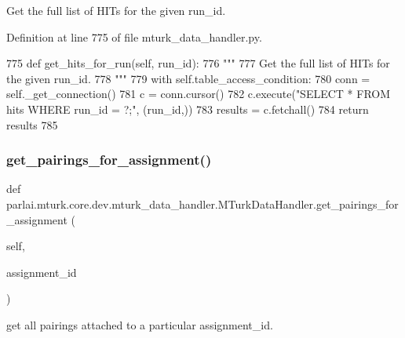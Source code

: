 \begin{DoxyVerb}Get the full list of HITs for the given run_id.
\end{DoxyVerb}
 

Definition at line 775 of file mturk\+\_\+data\+\_\+handler.\+py.


\begin{DoxyCode}
775     \textcolor{keyword}{def }get\_hits\_for\_run(self, run\_id):
776         \textcolor{stringliteral}{"""}
777 \textcolor{stringliteral}{        Get the full list of HITs for the given run\_id.}
778 \textcolor{stringliteral}{        """}
779         with self.table\_access\_condition:
780             conn = self.\_get\_connection()
781             c = conn.cursor()
782             c.execute(\textcolor{stringliteral}{"SELECT * FROM hits WHERE run\_id = ?;"}, (run\_id,))
783             results = c.fetchall()
784             \textcolor{keywordflow}{return} results
785 
\end{DoxyCode}
\mbox{\label{classparlai_1_1mturk_1_1core_1_1dev_1_1mturk__data__handler_1_1MTurkDataHandler_a112a75abc2ccd02aa53119c88d1c6bb2}} 
\subsubsection{\texorpdfstring{get\+\_\+pairings\+\_\+for\+\_\+assignment()}{get\_pairings\_for\_assignment()}}
{\footnotesize\ttfamily def parlai.\+mturk.\+core.\+dev.\+mturk\+\_\+data\+\_\+handler.\+M\+Turk\+Data\+Handler.\+get\+\_\+pairings\+\_\+for\+\_\+assignment (\begin{DoxyParamCaption}\item[{}]{self,  }\item[{}]{assignment\+\_\+id }\end{DoxyParamCaption})}

\begin{DoxyVerb}get all pairings attached to a particular assignment_id.
\end{DoxyVerb}
 

